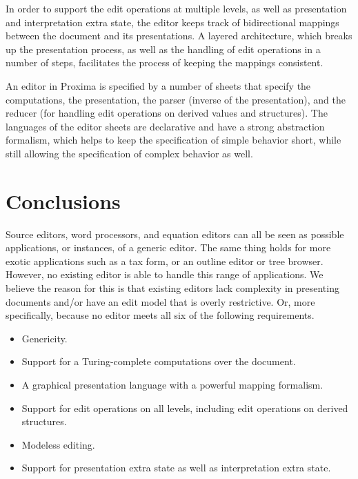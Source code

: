 In order to support the edit operations at multiple levels, as well as presentation and interpretation extra state, the editor keeps track of bidirectional mappings between the document and its presentations. A layered architecture, which breaks up the presentation process, as well as the handling of edit operations in a number of steps, facilitates the process of keeping the mappings consistent. 


An editor in Proxima is specified by a number of sheets that specify the computations, the presentation, the parser (inverse of the presentation), and the reducer (for handling edit operations on derived values and structures). The languages of the editor sheets are declarative and have a strong abstraction formalism, which helps to keep the specification of simple behavior short, while still allowing the specification of complex behavior as well.

\section{Conclusions}

Source editors, word processors, and equation editors can all be seen as possible applications, or instances, of a generic editor.  The same thing holds for more exotic applications such as a tax form, or an outline editor or tree browser. However, no existing editor is able to handle this range of applications. We believe the reason for this is that existing editors lack complexity in presenting documents and/or have an edit model that is overly restrictive. Or, more specifically, because no editor meets all six of the following requirements.

\begin{itemize}
\item Genericity.
\item Support for a Turing-complete computations over the document.
\item A graphical presentation language with a powerful mapping formalism.
\item Support for edit operations on all levels, including edit operations on derived structures.
\item Modeless editing.
\item Support for presentation extra state as well as interpretation extra state.
\end{itemize}

